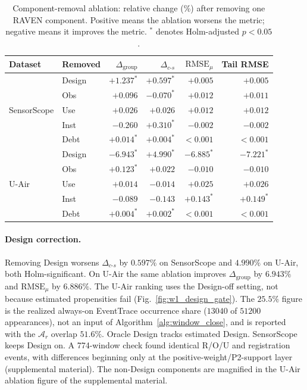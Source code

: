 \documentclass[letterpaper,journal]{IEEEtran}
\begin{document}
\begin{table}[!htbp]
\centering
\caption{Component-removal ablation: relative change (\%) after removing one RAVEN component.
Positive means the ablation worsens the metric; negative means it improves the
metric.  $^\ast$ denotes Holm-adjusted $p<0.05$.}
\label{tab:e4_ablation}
\setlength{\tabcolsep}{3.5pt}
\begin{tabular}{llrrrr}
\toprule
Dataset & Removed & $\Delta_{\mathrm{group}}$ &
$\Delta_{c\text{-}s}$ & $\mathrm{RMSE}_{\mu}$ & Tail RMSE\\
\midrule
\multirow{5}{*}{SensorScope}
& Design & $+1.237^\ast$ & $+0.597^\ast$ & $+0.005$ & $+0.005$\\
& Obs    & $+0.096$       & $-0.070^\ast$ & $+0.012$ & $+0.011$\\
& Use    & $+0.026$       & $+0.026$       & $+0.012$ & $+0.012$\\
& Inst   & $-0.260$       & $+0.310^\ast$ & $-0.002$ & $-0.002$\\
& Debt   & $+0.014^\ast$ & $+0.004^\ast$ & $<0.001$ & $<0.001$\\
\midrule
\multirow{5}{*}{U-Air}
& Design & $-6.943^\ast$ & $+4.990^\ast$ & $-6.885^\ast$ & $-7.221^\ast$\\
& Obs    & $+0.123^\ast$ & $+0.022$       & $-0.010$       & $-0.010$\\
& Use    & $+0.014$       & $-0.014$       & $+0.025$       & $+0.026$\\
& Inst   & $-0.089$       & $-0.143$       & $+0.143^\ast$ & $+0.149^\ast$\\
& Debt   & $+0.004^\ast$ & $+0.002^\ast$ & $<0.001$ & $<0.001$\\
\bottomrule
\end{tabular}
\end{table}

\paragraph{Design correction.}
Removing Design worsens $\Delta_{c\text{-}s}$ by $0.597\%$ on SensorScope and
$4.990\%$ on U-Air, both Holm-significant.  On U-Air the same ablation
improves $\Delta_{\mathrm{group}}$ by $6.943\%$ and
$\mathrm{RMSE}_{\mu}$ by $6.886\%$.  The U-Air ranking uses the Design-off
setting, not because estimated propensities fail
(Fig.~\ref{fig:w1_design_gate}).  The $25.5\%$ figure is the realized always-on
EventTrace occurrence share ($13040$ of $51200$ appearances), not an
input of Algorithm~\ref{alg:window_close}, and is reported with the $\mathcal{A}_r$ overlap
$51.6\%$.  Oracle Design tracks estimated
Design.  SensorScope keeps Design on.  A 774-window check found identical
R/O/U and registration events, with differences beginning only at the
positive-weight/P2-support layer
(supplemental material).
The non-Design components are magnified in the U-Air ablation figure of the supplemental material.
\end{document}
